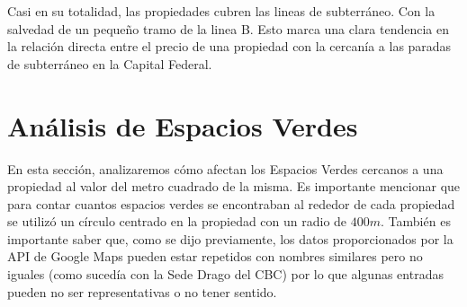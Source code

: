 \documentclass[a4paper, 10pt]{article}
\begin{document}
				Casi en su totalidad, las propiedades cubren las lineas de subterráneo. 
				Con la salvedad de un pequeño tramo de la linea B. Esto marca una clara tendencia en 
				la relación directa entre el precio de una propiedad con la cercanía a las 
				paradas de subterráneo en la Capital Federal.
				
		\section{Análisis de Espacios Verdes}
		En esta sección, analizaremos cómo afectan los Espacios Verdes cercanos a una propiedad al valor del metro cuadrado de la
		misma. Es importante mencionar que para contar cuantos espacios verdes se encontraban al rededor de cada propiedad se utilizó
		un círculo centrado en la propiedad con un radio de $400m$. También es importante saber que, como se dijo previamente, los
		datos proporcionados por la API de Google Maps pueden estar repetidos con nombres similares pero no iguales (como sucedía
		con la Sede Drago del CBC) por lo que algunas entradas pueden no ser representativas o no tener sentido.
\end{document}

